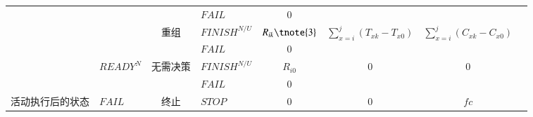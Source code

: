 \begin{table}[htbp]
\begin{threeparttable}
\begin{tabular}{llllllll}
            \multicolumn{1}{|c|}{} 
            &       
            & \multicolumn{1}{|c}{} 
            & \multicolumn{1}{|l}{$FAIL$} 
            & \multicolumn{1}{|c}{0} 
            & \multicolumn{1}{|c}{} 
            & \multicolumn{1}{|c|}{} \\
            \cline{3-7}
            
            \multicolumn{1}{|c|}{} 
            &       
            & \multicolumn{1}{|c}{\multirow{2}{*}{重组}} 
            & \multicolumn{1}{|l}{$FINISH^{N/U}$} 
            & \multicolumn{1}{|c}{$R_{ik}\tnote{3}$} 
            & \multicolumn{1}{|c}{\multirow{2}{*}{$\sum\limits_{x = i}^j {({T_{xk}} - {T_{x0}})} $}}
            & \multicolumn{1}{|c|}{\multirow{2}{*}{$\sum\limits_{x = i}^j {({C_{xk}} - {C_{x0}})} $}} \\
            
            \multicolumn{1}{|c|}{} 
            &       
            & \multicolumn{1}{|c}{} 
            & \multicolumn{1}{|l}{$FAIL$} 
            & \multicolumn{1}{|c}{0} 
            & \multicolumn{1}{|c}{}
            & \multicolumn{1}{|c|}{} \\
            \cline{2-7}
            
            \multicolumn{1}{|c|}{} 
            & \multirow{2}{*}{$READY^N$} 
            & \multicolumn{1}{|c}{\multirow{2}{*}{无需决策}} 
            & \multicolumn{1}{|l}{$FINISH^{N/U}$} 
            & \multicolumn{1}{|c}{$R_{i0}$} 
            & \multicolumn{1}{|c}{\multirow{2}{*}{0}} 
            & \multicolumn{1}{|c|}{\multirow{2}{*}{0}} \\
            
            \multicolumn{1}{|c|}{} 
            &       
            & \multicolumn{1}{|c}{} 
            & \multicolumn{1}{|l}{$FAIL$} 
            & \multicolumn{1}{|c}{0} 
            & \multicolumn{1}{|c}{} 
            & \multicolumn{1}{|c|}{} \\
            \cline{1-7}
            
            \multicolumn{1}{|c|}{\multirow{11}{*}{\parbox{1em}{活动执行后的状态}}} 
            & \multirow{7}{*}{$FAIL$} 
            & \multicolumn{1}{|c}{终止} 
            & \multicolumn{1}{|l}{$STOP$} 
            & \multicolumn{1}{|c}{0} 
            & \multicolumn{1}{|c}{0} 
            & \multicolumn{1}{|c|}{$fc$} \\
            \cline{3-7}
            

\end{tabular}
\end{threeparttable}
\end{table}
